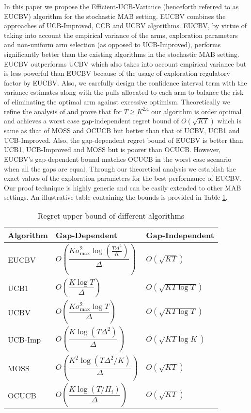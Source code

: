 In this paper we propose the Efficient-UCB-Variance (henceforth referred to as EUCBV) algorithm for the stochastic MAB setting. EUCBV combines the approaches of UCB-Improved, CCB \citep{liu2016modification} and UCBV algorithms. EUCBV, by virtue of taking into account the empirical variance of the arms, exploration parameters  and non-uniform arm selection (as opposed to UCB-Improved), performs significantly better than the existing algorithms in the stochastic MAB setting. EUCBV outperforms UCBV \citep{audibert2009exploration} which also takes into account empirical variance but is less powerful than EUCBV because of the usage of exploration regulatory factor by EUCBV. Also, we carefully design the confidence interval term with the variance estimates along with the pulls allocated to each arm to balance the risk of eliminating the optimal arm against excessive optimism. Theoretically we refine the analysis of \citet{auer2010ucb} and prove that for $T\geq K^{2.4}$ our algorithm is order optimal and achieves a worst case gap-independent regret bound of $O\left( \sqrt{KT} \right)$ which is same as that of MOSS and OCUCB but better than that of UCBV, UCB1 and UCB-Improved. Also, the gap-dependent regret bound of EUCBV is better than UCB1, UCB-Improved and MOSS but is poorer than OCUCB. However, EUCBV's gap-dependent bound matches OCUCB in the worst case scenario when all the gaps are equal. Through our theoretical analysis we establish the exact values of the exploration parameters for the best performance of EUCBV. Our proof technique is highly generic and can be easily extended to other MAB settings. An illustrative table containing the bounds is provided in Table \ref{tab:comp-bds}. 


\begin{table}[t]
\caption{Regret upper bound of different algorithms}
\label{tab:comp-bds}
\begin{center}
\begin{tabular}{p{3em}p{9em}p{7em}}
\toprule
Algorithm  &   \hspace*{1mm}Gap-Dependent & Gap-Independent \\
\hline
EUCBV		& $O\left( \dfrac{K\sigma_{\max}^{2}\log (\frac{T\Delta^2}{K})}{\Delta}\right)$ & $O\left(\sqrt{KT}\right)$\\
UCB1        & $O\left( \dfrac{K\log T}{\Delta} \right)$ & $O\left(\sqrt{KT\log T}\right)$ \\%
UCBV        & $O\left( \dfrac{K\sigma_{\max}^{2}\log T}{\Delta} \right)$ & $O\left(\sqrt{KT\log T}\right)$ \\
UCB-Imp 		& $O\left( \dfrac{K\log (T\Delta^2)}{\Delta} \right)$ & $O\left(\sqrt{KT\log K}\right)$ \\%
MOSS	     	& $O\left( \dfrac{K^2\log (T\Delta^2 /K)}{\Delta}\right)$ & $O\left(\sqrt{KT}\right)$\\%
OCUCB     	& $O\left( \dfrac{K\log (T/ H_{i})}{\Delta}\right)$ & $O\left(\sqrt{KT}\right)$\\\midrule
\end{tabular}
\end{center}
\vspace*{-2em}
\end{table}


